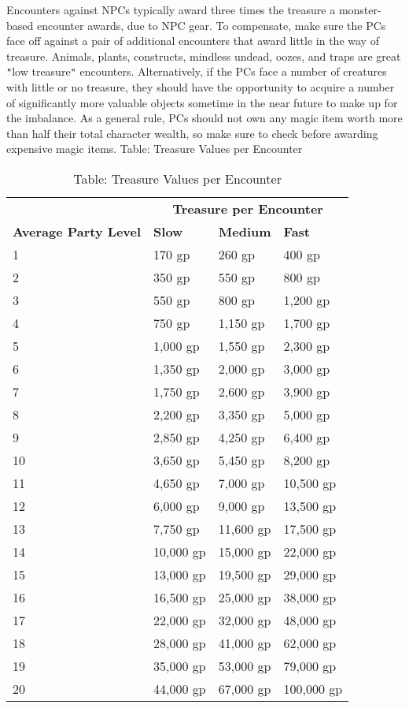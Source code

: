 Encounters against NPCs typically award three times the treasure a monster-based encounter awards, due to NPC gear. To compensate, make sure the PCs face off against a pair of additional encounters that award little in the way of treasure. Animals, plants, constructs, mindless undead, oozes, and traps are great \texttt{{}"{}}low treasure\texttt{{}"{}} encounters. Alternatively, if the PCs face a number of creatures with little or no treasure, they should have the opportunity to acquire a number of significantly more valuable objects sometime in the near future to make up for the imbalance. As a general rule, PCs should not own any magic item worth more than half their total character wealth, so make sure to check before awarding expensive magic items.
Table: Treasure Values per Encounter
\begin{table}[]
\sffamily
\caption{Table: Treasure Values per Encounter}
\begin{tabular}{llll}
 & \multicolumn{3}{c}{\textbf{Treasure per Encounter}}\\
\textbf{Average Party Level} & \textbf{Slow} & \textbf{Medium} & \textbf{Fast}\\
1 & 170 gp & 260 gp & 400 gp \\
 2 & 350 gp & 550 gp & 800 gp \\
 3 & 550 gp & 800 gp & 1,200 gp \\
 4 & 750 gp & 1,150 gp & 1,700 gp \\
 5 & 1,000 gp & 1,550 gp & 2,300 gp \\
 6 & 1,350 gp & 2,000 gp & 3,000 gp \\
 7 & 1,750 gp & 2,600 gp & 3,900 gp \\
 8 & 2,200 gp & 3,350 gp & 5,000 gp \\
 9 & 2,850 gp & 4,250 gp & 6,400 gp \\
 10 & 3,650 gp & 5,450 gp & 8,200 gp \\
 11 & 4,650 gp & 7,000 gp & 10,500 gp \\
 12 & 6,000 gp & 9,000 gp & 13,500 gp \\
 13 & 7,750 gp & 11,600 gp & 17,500 gp \\
 14 & 10,000 gp & 15,000 gp & 22,000 gp \\
 15 & 13,000 gp & 19,500 gp & 29,000 gp \\
 16 & 16,500 gp & 25,000 gp & 38,000 gp \\
 17 & 22,000 gp & 32,000 gp & 48,000 gp \\
 18 & 28,000 gp & 41,000 gp & 62,000 gp \\
 19 & 35,000 gp & 53,000 gp & 79,000 gp \\
 20 & 44,000 gp & 67,000 gp & 100,000 gp\\
\end{tabular}
\end{table}
